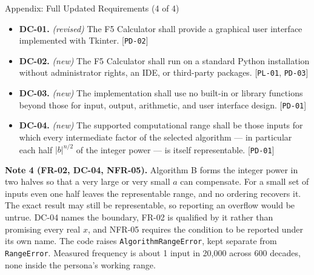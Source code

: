 \documentclass[11pt]{beamer}
\begin{document}
\begin{frame}{Appendix: Full Updated Requirements (4 of 4)}
  \scriptsize
  \begin{itemize}
    \item \textbf{DC-01.} \emph{(revised)} The F5 Calculator shall provide a
          graphical user interface implemented with Tkinter. [\texttt{PD-02}]
    \item \textbf{DC-02.} \emph{(new)} The F5 Calculator shall run on a
          standard Python installation without administrator rights, an IDE,
          or third-party packages. [\texttt{PL-01}, \texttt{PD-03}]
    \item \textbf{DC-03.} \emph{(new)} The implementation shall use no
          built-in or library functions beyond those for input, output,
          arithmetic, and user interface design. [\texttt{PD-01}]
    \item \textbf{DC-04.} \emph{(new)} The supported computational range
          shall be those inputs for which every intermediate factor of the
          selected algorithm --- in particular each half $|b|^{n/2}$ of the
          integer power --- is itself representable. [\texttt{PD-01}]
  \end{itemize}
  \medskip
  \textbf{Note 4 (FR-02, DC-04, NFR-05).} Algorithm B forms the integer
  power in two halves so that a very large or very small $a$ can compensate.
  For a small set of inputs even one half leaves the representable range,
  and no ordering recovers it. The exact result may still be representable,
  so reporting an overflow would be untrue. DC-04 names the boundary, FR-02
  is qualified by it rather than promising every real $x$, and NFR-05
  requires the condition to be reported under its own name. The code raises
  \texttt{AlgorithmRangeError}, kept separate from \texttt{RangeError}.
  Measured frequency is about 1 input in 20{,}000 across 600 decades, none
  inside the persona's working range.
\end{frame}
\end{document}
